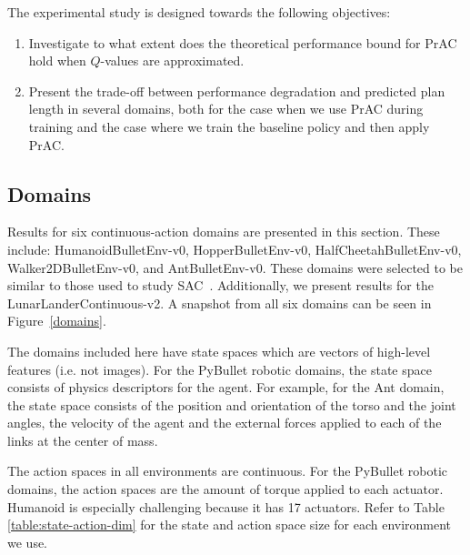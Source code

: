 \documentclass[letterpaper]{article} %
\begin{document}
        The experimental study is designed towards the following objectives:
        \begin{enumerate}
            \item Investigate to what extent does the theoretical performance bound for PrAC hold when $Q$-values are approximated.
            
            \item Present the trade-off between performance degradation and predicted plan length in several domains, both for the case when we use PrAC during training and the case where we train the baseline policy and then apply PrAC. 
        \end{enumerate}



        \subsection{Domains}
            Results for six continuous-action domains are presented in this section. These include: HumanoidBulletEnv-v0, HopperBulletEnv-v0, HalfCheetahBulletEnv-v0, Walker2DBulletEnv-v0, and AntBulletEnv-v0. 
            These domains were selected to be similar to those used to study SAC~\cite{haarnoja2018soft}. 
            Additionally, we present results for the LunarLanderContinuous-v2. %
            A snapshot from all six domains can be seen in Figure~\ref{domains}.



            The domains included here have state spaces which are vectors of high-level features (i.e. not images). For the PyBullet robotic domains, the state space consists of physics descriptors for the agent. For example, for the Ant domain, the state space consists of the position and orientation of the torso and the joint angles, the velocity of the agent and the external forces applied to each of the links at the center of mass.

            The action spaces in all environments are continuous. For the PyBullet robotic domains, the action spaces are the amount of torque applied to each actuator. Humanoid is especially challenging because it has 17 actuators. Refer to Table \ref{table:state-action-dim} for the state and action space size for each environment we use.
\end{document}
